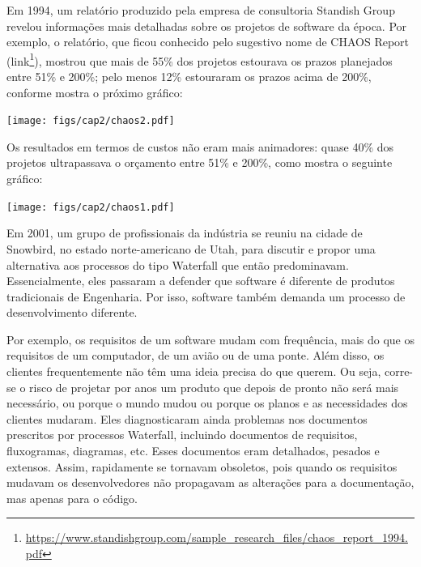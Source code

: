 \documentclass[
  11pt,
  twoside]{book}
\DeclareRobustCommand{\href}[2]{#2\footnote{\url{#1}}}
\let\origfigure\figure
\let\endorigfigure\endfigure
\renewenvironment{figure}[1][2] {
    \expandafter\origfigure\expandafter[!h]
} {
    \endorigfigure
}
\begin{document}
 Em 1994, um relatório produzido pela empresa de
consultoria Standish Group revelou informações mais detalhadas sobre os
projetos de software da época. Por exemplo, o relatório, que ficou
conhecido pelo sugestivo nome de CHAOS Report
(\href{https://www.standishgroup.com/sample_research_files/chaos_report_1994.pdf}{link}),
mostrou que mais de 55\% dos projetos estourava os prazos planejados
entre 51\% e 200\%; pelo menos 12\% estouraram os prazos acima de 200\%,
conforme mostra o próximo gráfico:

\begin{figure}
\centering
\texttt{[image: figs/cap2/chaos2.pdf]}
\caption{CHAOS Report (1994): percentual de projetos que estourava seus
\textbf{prazos} (para cada faixa de estouro).}
\end{figure}

Os resultados em termos de custos não eram mais animadores: quase 40\%
dos projetos ultrapassava o orçamento entre 51\% e 200\%, como mostra o
seguinte gráfico:

\begin{figure}
\centering
\texttt{[image: figs/cap2/chaos1.pdf]}
\caption{CHAOS Report (1994): percentual de projetos que estourava seus
\textbf{orçamentos} (para cada faixa de estouro).}
\end{figure}

Em 2001, um grupo de profissionais da indústria se reuniu na cidade de
Snowbird, no estado norte-americano de Utah, para discutir e propor uma
alternativa aos processos do tipo Waterfall que então predominavam.
Essencialmente, eles passaram a defender que software é diferente de
produtos tradicionais de Engenharia. Por isso, software também demanda
um processo de desenvolvimento diferente.

Por exemplo, os requisitos de um software mudam com frequência, mais do
que os requisitos de um computador, de um avião ou de uma ponte. Além
disso, os clientes frequentemente não têm uma ideia precisa do que
querem. Ou seja, corre-se o risco de projetar por anos um produto que
depois de pronto não será mais necessário, ou porque o mundo mudou ou
porque os planos e as necessidades dos clientes mudaram. Eles
diagnosticaram ainda problemas nos documentos prescritos por processos
Waterfall, incluindo documentos de requisitos, fluxogramas, diagramas,
etc. Esses documentos eram detalhados, pesados e extensos. Assim,
rapidamente se tornavam obsoletos, pois quando os requisitos mudavam os
desenvolvedores não propagavam as alterações para a documentação, mas
apenas para o código.
\end{document}
